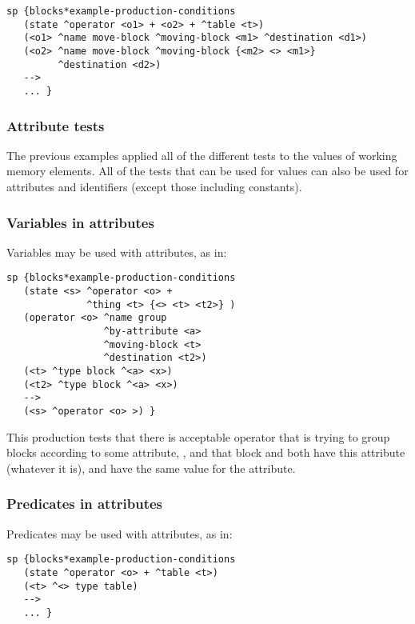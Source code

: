 \begin{verbatim}
sp {blocks*example-production-conditions
   (state ^operator <o1> + <o2> + ^table <t>)
   (<o1> ^name move-block ^moving-block <m1> ^destination <d1>)
   (<o2> ^name move-block ^moving-block {<m2> <> <m1>} 
         ^destination <d2>)
   -->
   ... }
\end{verbatim}

\subsubsection{Attribute tests}
\label{SYNTAX-pm-lhs-attributes}

The previous examples applied all of the different tests to the values of working memory elements. All of the tests that can be used for values can also be used for attributes and identifiers (except those including constants).

\subsubsection*{Variables in attributes}

Variables may be used with attributes, as in:

\begin{verbatim}
sp {blocks*example-production-conditions
   (state <s> ^operator <o> + 
              ^thing <t> {<> <t> <t2>} )
   (operator <o> ^name group 
                 ^by-attribute <a>
                 ^moving-block <t>
                 ^destination <t2>)
   (<t> ^type block ^<a> <x>)
   (<t2> ^type block ^<a> <x>)
   -->
   (<s> ^operator <o> >) }
\end{verbatim}

This production tests that there is acceptable operator that is trying to group blocks according to some attribute, , and that block  and  both have this attribute (whatever it is), and have the same value for the attribute.


\subsubsection*{Predicates in attributes}

Predicates may be used with attributes, as in:

\begin{verbatim}
sp {blocks*example-production-conditions
   (state ^operator <o> + ^table <t>)
   (<t> ^<> type table)
   -->
   ... }
\end{verbatim}


